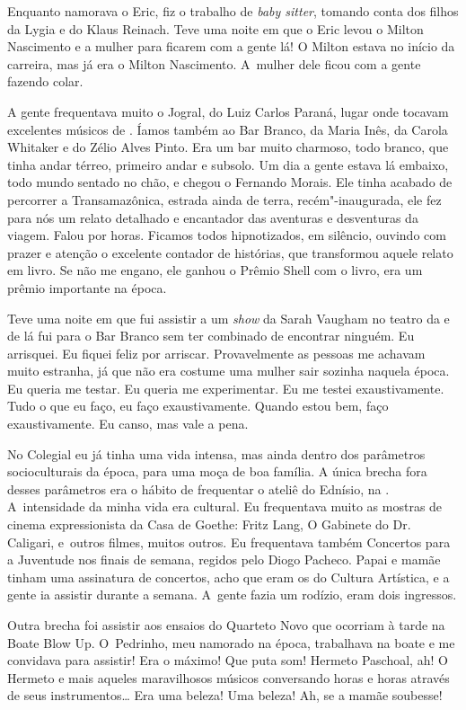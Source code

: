 Enquanto namorava o Eric, fiz o trabalho de \emph{baby sitter}, tomando
conta dos filhos da Lygia e do Klaus Reinach. Teve uma noite em que o
Eric levou o Milton Nascimento e a mulher para ficarem com a gente lá! O
Milton estava no início da carreira, mas já era o Milton Nascimento. A~mulher dele ficou com a gente fazendo colar.

A gente frequentava muito o Jogral, do Luiz Carlos Paraná, lugar onde
tocavam excelentes músicos de . Íamos também ao Bar Branco, da Maria
Inês, da Carola Whitaker e do Zélio Alves Pinto. Era um bar muito
charmoso, todo branco, que tinha andar térreo, primeiro andar e subsolo.
Um dia a gente estava lá embaixo, todo mundo sentado no chão, e chegou o
Fernando Morais. Ele tinha acabado de percorrer a Transamazônica,
estrada ainda de terra, recém"-inaugurada, ele fez para nós um relato
detalhado e encantador das aventuras e desventuras da viagem. Falou por
horas. Ficamos todos hipnotizados, em silêncio, ouvindo com prazer e
atenção o excelente contador de histórias, que transformou aquele relato
em livro. Se não me engano, ele ganhou o Prêmio Shell com o livro, era
um prêmio importante na época.

Teve uma noite em que fui assistir a um \emph{show} da Sarah Vaugham no
teatro da  e de lá fui para o Bar Branco sem ter combinado de
encontrar ninguém. Eu arrisquei. Eu fiquei feliz por arriscar.
Provavelmente as pessoas me achavam muito estranha, já que não era
costume uma mulher sair sozinha naquela época. Eu queria me testar. Eu
queria me experimentar. Eu me testei exaustivamente. Tudo o que eu faço,
eu faço exaustivamente. Quando estou bem, faço exaustivamente. Eu canso,
mas vale a pena.

No Colegial eu já tinha uma vida intensa, mas ainda dentro dos
parâmetros socioculturais da época, para uma moça de boa família. A
única brecha fora desses parâmetros era o hábito de frequentar o ateliê
do Ednísio, na . A~intensidade da minha vida era cultural. Eu
frequentava muito as mostras de cinema expressionista da Casa de Goethe:
Fritz Lang, O Gabinete do Dr. Caligari, e~outros filmes, muitos outros.
Eu frequentava também Concertos para a Juventude nos finais de semana,
regidos pelo Diogo Pacheco. Papai e mamãe tinham uma assinatura de
concertos, acho que eram os do Cultura Artística, e a gente ia assistir
durante a semana. A~gente fazia um rodízio, eram dois ingressos.

Outra brecha foi assistir aos ensaios do Quarteto Novo que ocorriam à
tarde na Boate Blow Up. O~Pedrinho, meu namorado na época, trabalhava na
boate e me convidava para assistir! Era o máximo! Que puta som! Hermeto
Paschoal, ah! O Hermeto e mais aqueles maravilhosos músicos conversando
horas e horas através de seus instrumentos… Era uma beleza! Uma
beleza! Ah, se a mamãe soubesse!

